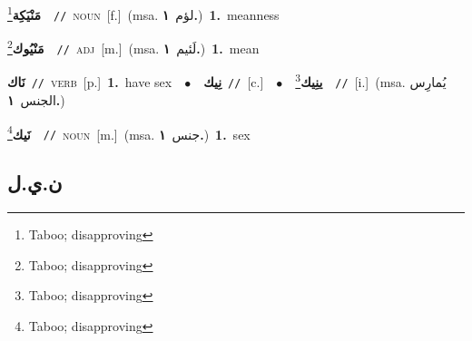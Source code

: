 \documentclass[10pt,a4paper,twoside]{article} %
\begin{document}
\begin{multicols}{2}
{\setlength\topsep{0pt}\textbf{\foreignlanguage{arabic}{مَنْيَكِة}}\footnote{Taboo; disapproving}\ \ {\color{gray}\texttt{//}\color{black}}\ \textsc{noun}\ [f.]\ \color{gray}(msa. \foreignlanguage{arabic}{لؤم}~\foreignlanguage{arabic}{\textbf{١.}})\color{black}\ \textbf{1.}~meanness\ } \vspace{2mm}

{\setlength\topsep{0pt}\textbf{\foreignlanguage{arabic}{مَنْيُوك}}\footnote{Taboo; disapproving}\ \ {\color{gray}\texttt{//}\color{black}}\ \textsc{adj}\ [m.]\ \color{gray}(msa. \foreignlanguage{arabic}{لَئيم}~\foreignlanguage{arabic}{\textbf{١.}})\color{black}\ \textbf{1.}~mean\ } \vspace{2mm}

{\setlength\topsep{0pt}\textbf{\foreignlanguage{arabic}{نَاك}}\ {\color{gray}\texttt{//}\color{black}}\ \textsc{verb}\ [p.]\ \textbf{1.}~have sex\ \ $\bullet$\ \ \setlength\topsep{0pt}\textbf{\foreignlanguage{arabic}{نِيك}}\ {\color{gray}\texttt{//}\color{black}}\ [c.]\ \ $\bullet$\ \ \setlength\topsep{0pt}\textbf{\foreignlanguage{arabic}{ينِيك}}\footnote{Taboo; disapproving}\ \ {\color{gray}\texttt{//}\color{black}}\ [i.]\ \color{gray}(msa. \foreignlanguage{arabic}{يُمارِس الجنس}~\foreignlanguage{arabic}{\textbf{١.}})\color{black}\ } \vspace{2mm}

{\setlength\topsep{0pt}\textbf{\foreignlanguage{arabic}{نَيك}}\footnote{Taboo; disapproving}\ \ {\color{gray}\texttt{//}\color{black}}\ \textsc{noun}\ [m.]\ \color{gray}(msa. \foreignlanguage{arabic}{جنس}~\foreignlanguage{arabic}{\textbf{١.}})\color{black}\ \textbf{1.}~sex\ } \vspace{2mm}

\vspace{-3mm}
\subsection*{\color{blue}\foreignlanguage{arabic}{ن.ي.ل}\color{blue}{}} 


\end{multicols}
\end{document}
